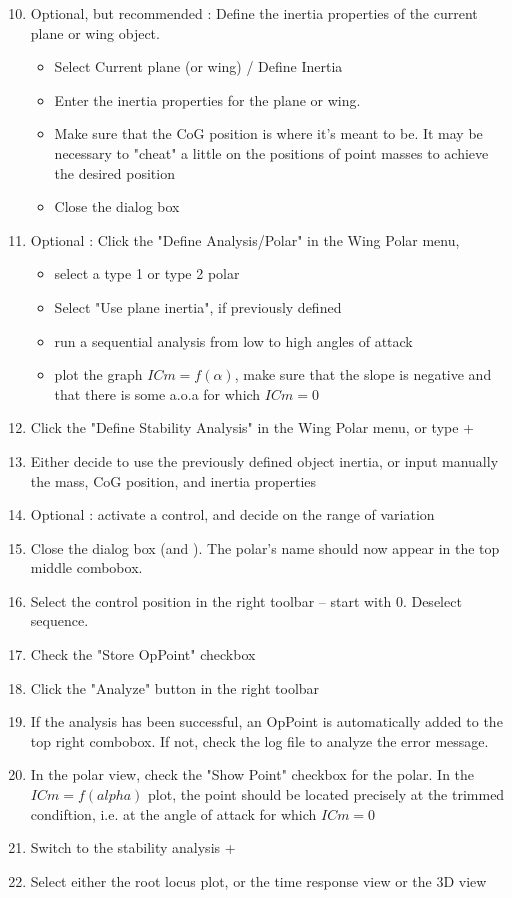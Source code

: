 \documentclass[a4paper,twoside,12pt,dvips]{article}
\begin{document}
\begin{enumerate}
\setcounter{enumi}{9}
\item Optional, but recommended : Define the inertia properties of the
current plane or wing object.
\begin{itemize}
\item Select Current plane (or wing) / Define Inertia
\item Enter the inertia properties for the plane or wing.
\item Make sure that the CoG position is where it's meant to be. It
may be necessary to "cheat" a little on the positions of point
masses to achieve the desired position
\item Close the dialog box
\end{itemize}
\item Optional : Click the "Define Analysis/Polar" in the Wing Polar
menu,
\begin{itemize}
\item select a type 1 or type 2 polar
\item Select "Use plane inertia", if previously defined
\item run a sequential analysis from low to high angles of attack
\item plot the graph $ICm=f(\alpha)$, make sure that the slope is negative
and that there is some a.o.a for which $ICm=0$
\end{itemize}
\item Click the "Define Stability Analysis" in the Wing Polar menu,
or type \Shift + 
\item Either decide to use the previously defined object inertia, or
input manually the mass, CoG position, and inertia properties
\item Optional : activate a control, and decide on the range of
variation
\item Close the dialog box (\Return and \Return). The polar's name
should now appear in the top middle combobox.
\item Select the control position in the right toolbar -- start with
0.  Deselect sequence.
\item Check the "Store OpPoint" checkbox
\item Click the "Analyze" button in the right toolbar
\item If the analysis has been successful, an OpPoint is automatically
added to the top right combobox. If not, check the log file to analyze
the error message.
\item In the polar view, check the "Show Point" checkbox for the
polar. In the $ICm=f(alpha)$ plot, the point should be located
precisely at the trimmed condiftion, i.e.  at the angle of attack for
which $ICm=0$
\item Switch to the stability analysis \Shift + 
\item Select either the root locus plot, or the time response view or
the 3D view
\end{enumerate}
\end{document}
